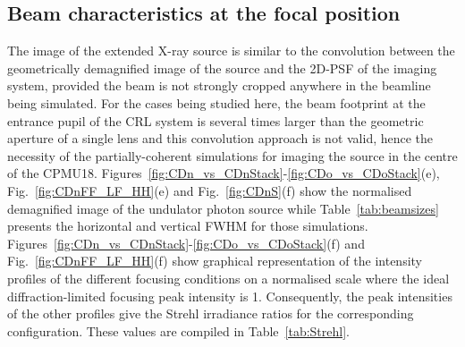 \begin{refsection}


\subsection{Beam characteristics at the focal position}\label{sec:source_image_sim}

The image of the extended X-ray source is similar to the convolution between the geometrically demagnified image of the source and the 2D-PSF of the imaging system, provided the beam is not strongly cropped anywhere in the beamline being simulated. For the cases being studied here, the beam footprint at the entrance pupil of the CRL system is several times larger than the geometric aperture of a single lens and this convolution approach is not valid, hence the necessity of the partially-coherent simulations for imaging the source in the centre of the CPMU18. Figures~\ref{fig:CDn_vs_CDnStack}-\ref{fig:CDo_vs_CDoStack}(e), Fig.~\ref{fig:CDnFF_LF_HH}(e) and Fig.~\ref{fig:CDnS}(f) show the normalised demagnified image of the undulator photon source while Table~\ref{tab:beamsizes} presents the horizontal and vertical FWHM for those simulations. Figures~\ref{fig:CDn_vs_CDnStack}-\ref{fig:CDo_vs_CDoStack}(f) and Fig.~\ref{fig:CDnFF_LF_HH}(f) show graphical representation of the intensity profiles of the different focusing conditions on a normalised scale where the ideal diffraction-limited focusing peak intensity is 1. Consequently, the peak intensities of the other profiles give the Strehl irradiance ratios for the corresponding configuration. These values are compiled in Table~\ref{tab:Strehl}.


\end{refsection}
